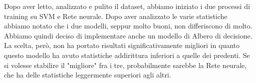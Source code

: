 Dopo aver letto, analizzato e pulito il dataset, abbiamo iniziato i due processi di training su SVM e Rete neurale. Dopo aver analizzato le varie statistiche abbiamo notato che i due modelli, seppur molto buoni, non differiscono di molto. Abbiamo quindi deciso di implementare anche un modello di Albero di decisione. La scelta, però, non ha portato risultati significativamente migliori in quanto questo modello ha avuto statistiche addirittura inferiori a quelle dei predenti.
Se si volesse stabilire il "migliore" fra i tre, probabilmente sarebbe la Rete neurale, che ha delle statistiche leggermente superiori agli altri.